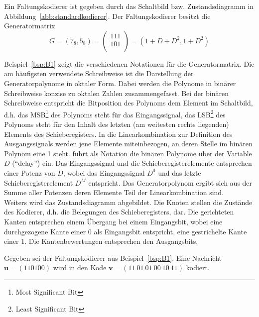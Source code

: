 \begin{beispiel} Ein Faltungskodierer ist gegeben durch das Schaltbild bzw. Zustandsdiagramm in Abbildung~\ref{abb:standardkodierer}. Der Faltungskodierer besitzt die Generatormatrix 
\begin{equation*}
G=\left(7_{8},5_{8}\right) = \begin{pmatrix}
111 \\
101 \\
\end{pmatrix} = \left(1+D+D^{2}, 1+D^{2} \right)
\end{equation*}
\label{bsp:B1}
\end{beispiel}
Beispiel~\ref{bsp:B1} zeigt die verschiedenen Notationen für die Generatormatrix. Die am häufigsten verwendete Schreibweise ist die Darstellung der Generatorpolynome in oktaler Form. Dabei werden die Polynome in binärer Schreibweise konzise zu oktalen Zahlen zusammengefasst. Bei der binären Schreibweise entspricht die Bitposition des Polynoms dem Element im Schaltbild, d.h. das MSB\footnote{Most Significant Bit} des Polynoms steht für das Eingangssignal, das LSB\footnote{Least Significant Bit} des Polynoms steht für den Inhalt des letzten (am weitesten rechts liegenden) Elements des Schieberegisters. In die Linearkombination zur Definition des Ausgangssignals werden jene Elemente miteinbezogen, an deren Stelle im binären Polynom eine 1 steht. \cite{huffman2010fundamentals} führt als Notation die binären Polynome über der Variable $D$ (\enquote{delay}) ein. Das Eingangssignal und die Schieberegisterelemente entsprechen einer Potenz von $D$, wobei das Eingangssignal $D^{0}$ und das letzte Schieberegisterelement $D^{M}$ entspricht. Das Generatorpolynom ergibt sich aus der Summe aller Potenzen deren Elemente Teil der Linearkombination sind.
\\
Weiters wird das Zustandsdiagramm abgebildet. Die Knoten stellen die Zustände des Kodierer, d.h. die Belegungen des Schieberegisters, dar. Die gerichteten Kanten entsprechen einem Übergang bei einem Eingangsbit, wobei eine durchgezogene Kante einer 0 als Eingangsbit entspricht, eine gestrichelte Kante einer 1. Die Kantenbewertungen entsprechen den Ausgangsbits.

\begin{beispiel} Gegeben sei der Faltungskodierer aus Beispiel~\ref{bsp:B1}. Eine Nachricht $\mathbf{u}=\left( 110100\right)$ wird in den Kode $\mathbf{v}=\left( 11~01~01~00~10~11\right)$ kodiert.
\label{bsp:B2}
\end{beispiel}

